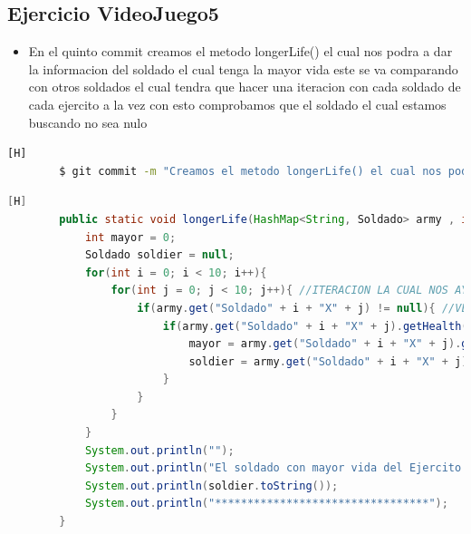 \documentclass{article}
\begin{document}
	\subsection{Ejercicio VideoJuego5}
	\begin{itemize}	
		\item En el quinto commit creamos el metodo longerLife() el cual nos podra a dar la informacion del soldado el cual tenga la mayor vida este se va comparando con otros soldados el cual tendra que hacer una iteracion con cada soldado de cada ejercito a la vez con esto comprobamos que el soldado el cual estamos buscando no sea nulo
	\end{itemize}	
	\begin{lstlisting}[language=bash,caption={Commit}][H]
		$ git commit -m "Creamos el metodo longerLife() el cual nos podra a dar la informacion del soldado el cual tenga la mayor vida este se va comparando con otros soldados el cual tendra que hacer una iteracion con cada soldado de cada ejercito a la vez con esto comprobamos que el soldado el cual estamos buscando no sea nulo"
	\end{lstlisting}	
	\begin{lstlisting}[language=java,caption={Las lineas de codigos del metodo creado:}][H]
		public static void longerLife(HashMap<String, Soldado> army , int num){
			int mayor = 0;
			Soldado soldier = null;
			for(int i = 0; i < 10; i++){
				for(int j = 0; j < 10; j++){ //ITERACION LA CUAL NOS AYUDA A PASAR POR TODOS LOS SOLDADOS DE CADA EJERCITO
					if(army.get("Soldado" + i + "X" + j) != null){ //VERIFICAMOS QUE EL SOLDADO EL CUAL ESTAMOS VERIFICANOD NO SEA UNO NULO
						if(army.get("Soldado" + i + "X" + j).getHealth() > mayor){
							mayor = army.get("Soldado" + i + "X" + j).getHealth(); //DETECTAMOS EL MAYOR EL CUAL VAMOS COMPRANDO CON LOS DEMAS SOLDADOS PARA TENER SOLO AL SOLDADO EL CUAL TENGA LA MAYOR VIDA
							soldier = army.get("Soldado" + i + "X" + j); //SOLDIER CONTENDRA A ESTE SOLDADO EL CUAL DESPUES SE IMPRIMIRA SUS DATOS PARA VER DE QUE SOLDADO SE TRATA
						}
					}
				}
			}
			System.out.println("");
			System.out.println("El soldado con mayor vida del Ejercito " + num + " es: ");
			System.out.println(soldier.toString());
			System.out.println("*********************************");
		}
	\end{lstlisting}
\end{document}
